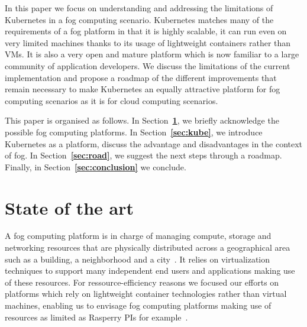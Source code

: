 \documentclass[letterpaper,twocolumn,10pt]{article}
\let\origref\ref
\def\ref#1{\textbf{\origref{#1}}}
\begin{document}
In this paper we focus on understanding and addressing the limitations
of Kubernetes in a fog computing scenario. Kubernetes matches many of
the requirements of a fog platform in that it is highly scalable, it
can run even on very limited machines thanks to its usage of
lightweight containers rather than VMs. It is also a very open and
mature platform which is now familiar to a large community of
application developers. We discuss the limitations of the current
implementation and propose a roadmap of the different improvements
that remain necessary to make Kubernetes an equally attractive
platform for fog computing scenarios as it is for cloud computing
scenarios.




This paper is organised as follows. In Section~\ref{sec:plat}, we
briefly acknowledge the possible fog computing platforms. In
Section~\ref{sec:kube}, we introduce Kubernetes as a platform, discuss
the advantage and disadvantages in the context of fog. In
Section~\ref{sec:road}, we suggest the next steps through a
roadmap. Finally, in Section~\ref{sec:conclusion} we conclude.


\section{State of the art}\label{sec:plat}

A fog computing platform is in charge of managing compute, storage and
networking resources that are physically distributed across a
geographical area such as a building, a neighborhood and a
city~\cite{Bonomi:2012:FCR:2342509.2342513, fogecosystem}. It relies
on virtualization techniques to support many independent end users and
applications making use of these resources. For ressource-efficiency
reasons we focused our efforts on platforms which rely on lightweight
container technologies rather than virtual machines, enabling us to
envisage fog computing platforms making use of resources as limited as
Rasperry PIs for example~\cite{vankempen:hal-01446483}.
\end{document}
